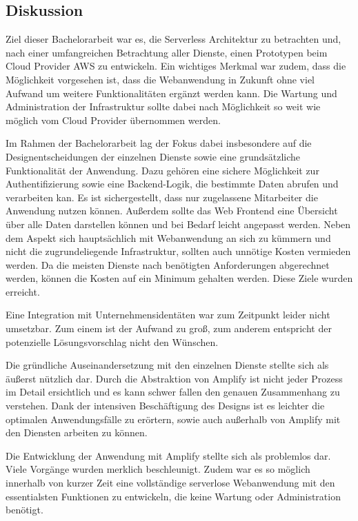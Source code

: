 \subsection{Diskussion}

Ziel dieser Bachelorarbeit war es, die Serverless Architektur zu betrachten und, nach einer umfangreichen Betrachtung aller Dienste, einen Prototypen beim Cloud Provider AWS zu entwickeln.
Ein wichtiges Merkmal war zudem, dass die Möglichkeit vorgesehen ist, dass die Webanwendung in Zukunft ohne viel Aufwand um weitere Funktionalitäten ergänzt werden kann.
Die Wartung und Administration der Infrastruktur sollte dabei nach Möglichkeit so weit wie möglich vom Cloud Provider übernommen werden.

Im Rahmen der Bachelorarbeit lag der Fokus dabei insbesondere auf die Designentscheidungen der einzelnen Dienste sowie eine grundsätzliche Funktionalität der Anwendung.
Dazu gehören eine sichere Möglichkeit zur Authentifizierung sowie eine Backend-Logik, die bestimmte Daten abrufen und verarbeiten kan.
Es ist sichergestellt, dass nur zugelassene Mitarbeiter die Anwendung nutzen können.
Außerdem sollte das Web Frontend eine Übersicht über alle Daten darstellen können und bei Bedarf leicht angepasst werden.
Neben dem Aspekt sich hauptsächlich mit Webanwendung an sich zu kümmern und nicht die zugrundeliegende Infrastruktur, sollten auch unnötige Kosten vermieden werden.
Da die meisten Dienste nach benötigten Anforderungen abgerechnet werden, können die Kosten auf ein Minimum gehalten werden.
Diese Ziele wurden erreicht.


Eine Integration mit Unternehmensidentäten war zum Zeitpunkt leider nicht umsetzbar.
Zum einem ist der Aufwand zu groß, zum anderem entspricht der potenzielle Lösungsvorschlag nicht den Wünschen.

Die gründliche Auseinandersetzung mit den einzelnen Dienste stellte sich als äußerst nützlich dar.
Durch die Abstraktion von Amplify ist nicht jeder Prozess im Detail ersichtlich und es kann schwer fallen den genauen Zusammenhang zu verstehen.
Dank der intensiven Beschäftigung des Designs ist es leichter die optimalen Anwendungsfälle zu erörtern, sowie auch außerhalb von Amplify mit den Diensten arbeiten zu können.

Die Entwicklung der Anwendung mit Amplify stellte sich als problemlos dar.
Viele Vorgänge wurden merklich beschleunigt.
Zudem war es so möglich innerhalb von kurzer Zeit eine vollständige serverlose Webanwendung mit den essentialsten Funktionen zu entwickeln, die keine Wartung oder Administration benötigt.

